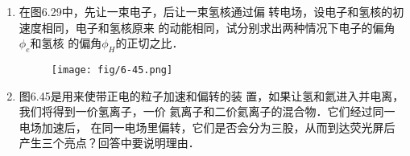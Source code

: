 \begin{enumerate}
\item 在图6.29中，先让一束电子，后让一束氢核通过偏
转电场，设电子和氢核的初速度相同，电子和氢核原来
的动能相同，试分别求出两种情况下电子的偏角$\phi_e$和氢核
的偏角$\phi_H$的正切之比．

\begin{figure}[htp]\centering
	\texttt{[image: fig/6-45.png]}
	\caption{}
	\end{figure}
	
\item 图6.45是用来使带正电的粒子加速和偏转的装
置，如果让氢和氦进入并电离，我们将得到一价氢离子，一价
氦离子和二价氦离子的混合物．它们经过同一电场加速后，
在同一电场里偏转，它们是否会分为三股，从而到达荧光屏后
产生三个亮点？回答中要说明理由．

\end{enumerate}









































